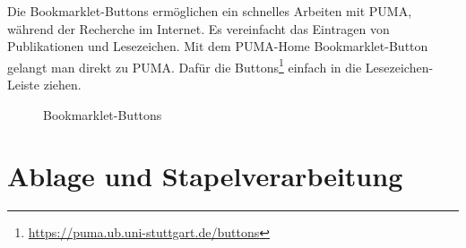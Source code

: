 Die Bookmarklet-Buttons ermöglichen ein schnelles Arbeiten mit PUMA, während der Recherche im Internet. Es vereinfacht das Eintragen von Publikationen und Lesezeichen. Mit dem PUMA-Home Bookmarklet-Button gelangt man direkt zu PUMA. Dafür die Buttons\footnote{\url{https://puma.ub.uni-stuttgart.de/buttons}} einfach in die Lesezeichen-Leiste ziehen.
\begin{figure}[h!]
 \centering
 \caption{Bookmarklet-Buttons}
 \label{fig:bookmarkletButtons}
\end{figure} 

\section{Ablage und Stapelverarbeitung}
